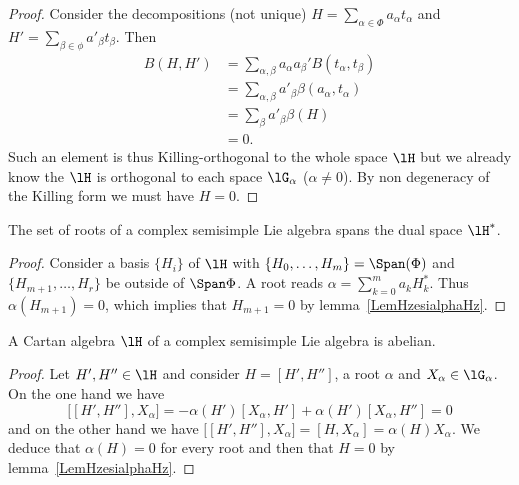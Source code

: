 \begin{proof}
    Consider the decompositions (not unique) \( H=\sum_{\alpha\in\Phi}a_{\alpha} t_{\alpha}\) and \( H'=\sum_{\beta\in\phi}a'_{\beta}t_{\beta}\). Then
    \begin{subequations}
        \begin{align}
            B(H,H')&=\sum_{\alpha,\beta}a_{\alpha}a_{\beta}'B(t_{\alpha},t_{\beta})\\
            &=\sum_{\alpha,\beta}a'_{\beta}\beta(a_{\alpha},t_{\alpha})\\
            &=\sum_{\beta}a'_{\beta}\beta(H)\\
            &=0.
        \end{align}
    \end{subequations}
    Such an element is thus Killing-orthogonal to the whole space \( \lH\) but we already know the \( \lH\) is orthogonal to each space \( \lG_{\alpha}\) (\( \alpha\neq 0\)). By non degeneracy of the Killing form we must have \( H=0\).
\end{proof}

\begin{proposition}
    The set of roots of a complex semisimple Lie algebra spans the dual space \( \lH^*\).
\end{proposition}

\begin{proof}
    Consider a basis \( \{ H_i \}\) of \( \lH\) with \( \{ H_0,\ldots,H_m \}=\Span(\Phi)\) and \( \{ H_{m+1},\ldots,H_r \}\) be outside of \( \Span\Phi\). A root reads \( \alpha=\sum_{k=0}^ma_kH_k^*\).
    Thus \( \alpha(H_{m+1})=0\), which implies that \( H_{m+1}=0\) by lemma~\ref{LemHzesialphaHz}.
\end{proof}

\begin{corollary}
    A Cartan algebra \( \lH\) of a complex semisimple Lie algebra is abelian.
\end{corollary}

\begin{proof}
    Let \( H',H''\in\lH\) and consider \( H=[H',H'']\), a root \( \alpha\) and \( X_{\alpha}\in\lG_{\alpha}\). On the one hand we have
    \begin{equation}
        \big[ [H',H''],X_{\alpha} \big]=-\alpha(H')[X_{\alpha},H']+\alpha(H')[X_{\alpha},H'']=0
    \end{equation}
    and on the other hand we have \( \big[ [H',H''],X_{\alpha} \big]=[H,X_{\alpha}]=\alpha(H)X_{\alpha}\). We deduce that \( \alpha(H)=0\) for every root and then that \( H=0\) by lemma~\ref{LemHzesialphaHz}.
\end{proof}


